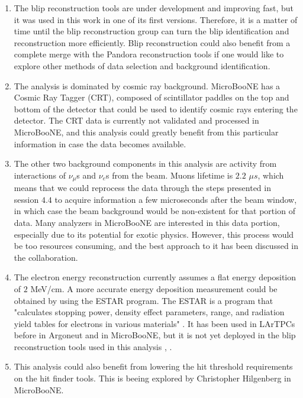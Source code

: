 \begin{enumerate}
    \item The blip reconstruction tools are under development and improving fast, but it was used in this work in one of its first versions. Therefore, it is a matter of time until the blip reconstruction group can turn the blip identification and reconstruction more efficiently. Blip reconstruction could also benefit from a complete merge with the Pandora reconstruction tools if one would like to explore other methods of data selection and background identification.

    \item The analysis is dominated by cosmic ray background. MicroBooNE has a Cosmic Ray Tagger (CRT), composed of scintillator paddles on the top and bottom of the detector that could be used to identify cosmic rays entering the detector. The CRT data is currently not validated and processed in MicroBooNE, and this analysis could greatly benefit from this particular information in case the data becomes available.  
    
    \item The other two background components in this analysis are activity from interactions of $\nu_{\mu}$s and $\nu_{e}$s from the beam. Muons lifetime is $2.2$ $\mu s$, which means that we could reprocess the data through the steps presented in session $4.4$ to acquire information a few microseconds after the beam window, in which case the beam background would be non-existent for that portion of data. Many analyzers in MicroBooNE are interested in this data portion, especially due to its potential for exotic physics. However, this process would be too resources consuming, and the best approach to it has been discussed in the collaboration.  
     
    \item The electron energy reconstruction currently assumes a flat energy deposition of $2$ MeV/cm. A more accurate energy deposition measurement could be obtained by using the ESTAR program. The ESTAR is a program that "calculates stopping power, density effect parameters, range, and radiation yield tables for electrons in various materials" \cite{ESTAR}. It has been used in LArTPCs before in Argoneut and in MicroBooNE, but it is not yet deployed in the blip reconstruction tools used in this analysis \cite{argoneut_mev}, \cite{microboone_mev}. 
    
    \item This analysis could also benefit from lowering the hit threshold requirements on the hit finder tools. This is beeing explored by Christopher Hilgenberg in MicroBooNE. 
\end{enumerate}
